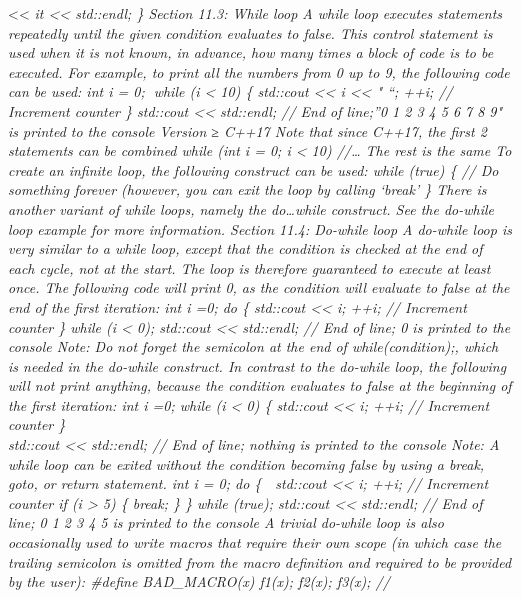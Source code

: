\textless\textless{} \emph{it \textless\textless{} std::endl; \} Section
11.3: While loop A while loop executes statements repeatedly until the
given condition evaluates to false. This control statement is used when
it is not known, in advance, how many times a block of code is to be
executed. For example, to print all the numbers from 0 up to 9, the
following code can be used: int i = 0; while (i \textless{} 10) \{
std::cout \textless\textless{} i \textless\textless{} " ``; ++i; //
Increment counter \} std::cout \textless\textless{} std::endl; // End of
line;''0 1 2 3 4 5 6 7 8 9" is printed to the console Version ≥ C++17
Note that since C++17, the ﬁrst 2 statements can be combined while (int
i = 0; i \textless{} 10) //\ldots{} The rest is the same To create an
inﬁnite loop, the following construct can be used: while (true) \{ // Do
something forever (however, you can exit the loop by calling `break' \}
There is another variant of while loops, namely the do\ldots while
construct. See the do-while loop example for more information. Section
11.4: Do-while loop A do-while loop is very similar to a while loop,
except that the condition is checked at the end of each cycle, not at
the start. The loop is therefore guaranteed to execute at least once.
The following code will print 0, as the condition will evaluate to false
at the end of the ﬁrst iteration: int i =0; do \{ std::cout
\textless\textless{} i; ++i; // Increment counter \} while (i
\textless{} 0); std::cout \textless\textless{} std::endl; // End of
line; 0 is printed to the console Note: Do not forget the semicolon at
the end of while(condition);, which is needed in the do-while construct.
In contrast to the do-while loop, the following will not print anything,
because the condition evaluates to false at the beginning of the ﬁrst
iteration: int i =0; while (i \textless{} 0) \{ std::cout
\textless\textless{} i; ++i; // Increment counter \}\\
std::cout \textless\textless{} std::endl; // End of line; nothing is
printed to the console Note: A while loop can be exited without the
condition becoming false by using a break, goto, or return statement.
int i = 0; do \{  std::cout \textless\textless{} i; ++i; // Increment
counter if (i \textgreater{} 5) \{ break; \} \} while (true); std::cout
\textless\textless{} std::endl; // End of line; 0 1 2 3 4 5 is printed
to the console A trivial do-while loop is also occasionally used to
write macros that require their own scope (in which case the trailing
semicolon is omitted from the macro deﬁnition and required to be
provided by the user): \#define BAD\_MACRO(x) f1(x); f2(x); f3(x); //
}
